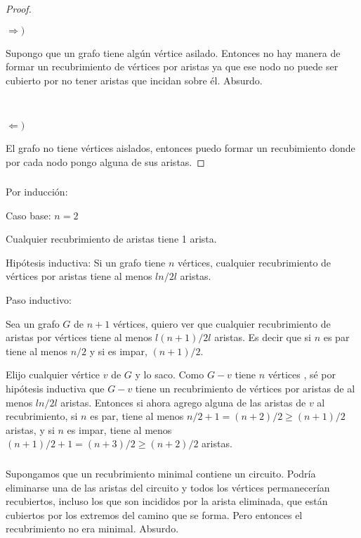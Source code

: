 \begin{proof}

	~

	$\Longrightarrow )$

	Supongo que un grafo tiene algún vértice asilado. Entonces no hay manera
	de formar un recubrimiento de vértices por aristas ya que ese nodo no
	puede ser cubierto por no tener aristas que incidan sobre él. Absurdo.

	~

	$\Longleftarrow )$

	El grafo no tiene vértices aislados, entonces puedo formar un
	recubimiento donde por cada nodo pongo alguna de sus aristas.
\end{proof}

\subsubsection{}

Por inducción:

Caso base: $n = 2$

Cualquier recubrimiento de aristas tiene 1 arista.

Hipótesis inductiva: Si un grafo tiene $n$ vértices, cualquier recubrimiento
de vértices por aristas tiene al menos $l{n/2}l$ aristas.

Paso inductivo:

Sea un grafo $G$ de $n + 1$ vértices, quiero ver que cualquier recubrimiento
de aristas por vértices tiene al menos $l(n + 1)/2l$ aristas. Es decir que si
$n$ es par tiene al menos $n/2$ y si es impar, $(n + 1)/2$.

Elijo cualquier vértice $v$ de $G$ y lo saco. Como $G - v$ tiene $n$ vértices
, sé por hipótesis inductiva que $G - v$ tiene un recubrimiento de vértices
por aristas de al menos $ln/2l$ aristas. Entonces si ahora agrego alguna de
las aristas de $v$ al recubrimiento, si $n$ es par, tiene al menos
$n/2 + 1 = (n + 2)/2 \geq (n + 1)/2$ aristas, y si $n$ es impar, tiene al
menos $(n + 1)/2 + 1 = (n + 3)/2 \geq (n + 2)/2$ aristas.

\setcounter{subsubsection}{3}
\subsubsection{}
Supongamos que un recubrimiento minimal contiene un circuito. Podría
eliminarse una de las aristas del circuito y todos los vértices permanecerían
recubiertos, incluso los que son incididos por la arista eliminada, que están
cubiertos por los extremos del camino que se forma. Pero entonces el
recubrimiento no era minimal. Absurdo.

